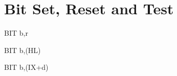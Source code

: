 \section{Bit Set, Reset and Test}

\begin{minipage}{\textwidth}

\begin{instrtable}

    \begin{instruction}{BIT b,r} 
            \FlagsBITr
        \SkipToOpCode 
    \end{instruction}

    \begin{instruction}{BIT b,(HL)} 
            \FlagsBITr
        \SkipToOpCode 
    \end{instruction}

    \begin{instruction}{BIT b,(IX+d)} 
            \FlagsBITr
        \SkipToOpCode 
        \SkipToOpCode
        \SkipToOpCode 
    \end{instruction}


\end{instrtable}
\end{minipage}
